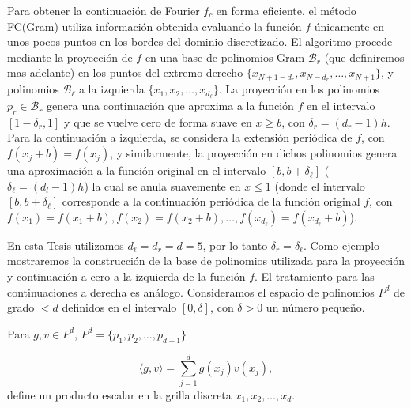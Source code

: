 Para obtener la continuación de Fourier $f_c$ en forma eficiente, el método FC(Gram) utiliza información obtenida 
evaluando la función $f$ únicamente en unos pocos puntos 
en los bordes del dominio discretizado. 
El algoritmo procede mediante la proyección de $f$ en una base de polinomios Gram $\mathcal{B}_r$ 
(que definiremos mas adelante) en los puntos del extremo 
derecho $\{x_{N+1-d_r},x_{N-d_r},\ldots, x_{N+1} \}$, y 
polinomios $\mathcal{B}_{\ell}$ a la izquierda $\{x_{1},x_{2},\ldots, x_{d_{\ell}} \}$. 
La proyección en los polinomios $p_r \in \mathcal{B}_r$ genera una continuación que 
aproxima a la función $f$ en el intervalo $[1-\delta_r,1]$ y que se vuelve cero de 
forma suave en $x\ge b$, con $\delta_r=(d_r-1)h$. Para la continuación a izquierda, se considera 
la extensión periódica de $f$, con $f(x_j+b)=f(x_j)$, y similarmente, la proyección 
en dichos polinomios genera una aproximación a la función original en el intervalo $[b,b+\delta_{\ell}]$ ($\delta_{\ell}=(d_l-1)h$) la cual se anula suavemente en $x\leq 1$ (donde el 
intervalo $[b,b+\delta_{\ell}]$ corresponde a la continuación periódica de la función original $f$, con $f(x_1)=f(x_1+b),f(x_2)=f(x_2+b),\ldots, f(x_{d_{\ell}})=f(x_{d_{\ell}}+b)$). 

En esta Tesis utilizamos $d_{\ell}=d_r=d=5$, por lo tanto $\delta_r=\delta_{\ell}$.  
Como ejemplo mostraremos la construcción de la base 
de polinomios utilizada para la proyección y continuación a cero 
a la izquierda de la función $f$. El tratamiento para las continuaciones a derecha 
es análogo.
Consideramos el espacio de polinomios $P^d$ de grado $<d$ definidos en el intervalo $[0,\delta]$, con $\delta>0$ un número pequeño.

Para $g,v\in P^d$, $P^d=\{p_1,p_2,...,p_{d-1}\}$

\begin{equation}
\langle g,v\rangle =\sum_{j=1}^{d}g(x_j)v(x_j),
\label{eq:dotpd}
\end{equation}
define un producto escalar en la grilla discreta $x_1,x_2,\ldots,x_d$.

